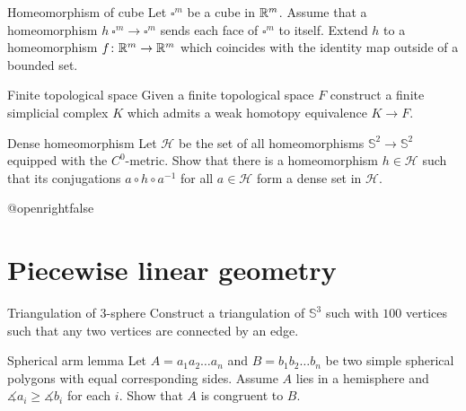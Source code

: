 \documentclass[twoside]{book}
\begin{document}
{\begin{pr}{}{Homeomorphism of cube}\label{Homeomorphism of cube}
Let $\square^m$ be a cube in $\mathbb{R}^m$.
Assume that a homeomorphism $h\:\square^m\to\square^m$ sends each face of $\square^m$ to itself.
Extend $h$ to a homeomorphism $f\colon\mathbb{R}^m\to\mathbb{R}^m$ which coincides with the identity map outside of a bounded set.    
\end{pr}


\begin{pr}{\easy}{Finite topological space}\label{Finite topological space}
Given a finite topological space $F$ 
construct a finite simplicial complex $K$
which admits a weak homotopy equivalence  $K\to F$. 
\end{pr}

\begin{pr}{\easy}{Dense homeomorphism}\label{Dense homeomorphism}
Let $\mathcal{H}$ be the set of all homeomorphisms $\mathbb {S}^2\to\mathbb {S}^2$ 
equipped with the $C^0$-metric.
Show that there is a homeomorphism $h\in \mathcal{H}$ such that its conjugations $a\circ h\circ a^{-1}$ for all $a\in\mathcal{H}$ form a dense set in $\mathcal{H}$.
 
\end{pr}











\csname @openrightfalse\endcsname
\chapter{Piecewise linear geometry}



\begin{pr}{}{Triangulation of 3-sphere}\label{4-poly}
Construct a triangulation of $\mathbb{S}^3$ 
such with $100$ vertices
such that any two vertices are connected by an edge.
\end{pr}

\begin{pr}{}{Spherical arm lemma}\label{Spherical arm lemma}
Let $A=a_1a_2\dots a_n$ and $B=b_1b_2\dots b_n$ be two simple spherical polygons 
with equal corresponding sides.
Assume $A$ lies in a hemisphere and $\measuredangle a_i\ge\measuredangle b_i$ for each $i$.
Show that $A$ is congruent to $B$.
\end{pr}



}
\end{document}
